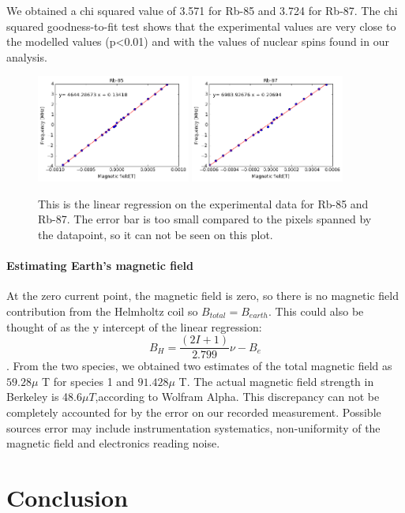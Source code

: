 \documentclass{sigchi}
\begin{document}
We obtained a chi squared value of 3.571 for Rb-85 and 3.724 for Rb-87. The chi squared goodness-to-fit test shows that the experimental values are very close to the modelled values (p<0.01) and with the values of nuclear spins found in our analysis.
\begin{figure}[h]
\includegraphics[width=0.45\textwidth]{plots/rb85.png}
\includegraphics[width=0.45\textwidth]{plots/rb87.png}
\caption{This is the linear regression on the experimental data for Rb-85 and Rb-87. The error bar is too small compared to the pixels spanned by the datapoint, so it can not be seen on this plot.}
\label{linear_fit}
\end{figure}
\paragraph{Estimating Earth's magnetic field}
\par At the zero current point, the magnetic field is zero, so there is no magnetic field contribution from the Helmholtz coil so $B_{total} = B_{earth}$. This could also be thought of as the y intercept of the linear regression: 
$$ B_H = \frac{(2I+1)}{2.799} \nu - B_e $$.
From the two species, we obtained two estimates of the total magnetic field as $59.28\mu$ T for species 1 and $91.428 \mu$ T. The actual magnetic field strength in Berkeley is 48.6$\mu T$,according to Wolfram Alpha. This discrepancy can not be completely accounted for by the error on our recorded measurement. Possible sources error may include instrumentation systematics, non-uniformity of the magnetic field and electronics reading noise. 
\section{Conclusion}\label{sec:conclusion}
 
\end{document}
